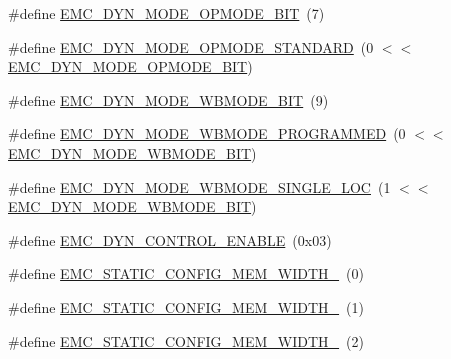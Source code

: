 \begin{DoxyCompactItemize}
\item 
\#define \hyperlink{group___e_m_c__18_x_x__43_x_x_ga8eb50a81b4d5000165734d85c5ecd2b3}{E\+M\+C\+\_\+\+D\+Y\+N\+\_\+\+M\+O\+D\+E\+\_\+\+O\+P\+M\+O\+D\+E\+\_\+\+B\+IT}~(7)
\item 
\#define \hyperlink{group___e_m_c__18_x_x__43_x_x_gad1a47dd7527a6cabcf3f4a692bcb4abe}{E\+M\+C\+\_\+\+D\+Y\+N\+\_\+\+M\+O\+D\+E\+\_\+\+O\+P\+M\+O\+D\+E\+\_\+\+S\+T\+A\+N\+D\+A\+RD}~(0 $<$$<$ \hyperlink{group___e_m_c__18_x_x__43_x_x_ga8eb50a81b4d5000165734d85c5ecd2b3}{E\+M\+C\+\_\+\+D\+Y\+N\+\_\+\+M\+O\+D\+E\+\_\+\+O\+P\+M\+O\+D\+E\+\_\+\+B\+IT})
\item 
\#define \hyperlink{group___e_m_c__18_x_x__43_x_x_gace9c2c7bc7470cb911f27bd4bb93e01c}{E\+M\+C\+\_\+\+D\+Y\+N\+\_\+\+M\+O\+D\+E\+\_\+\+W\+B\+M\+O\+D\+E\+\_\+\+B\+IT}~(9)
\item 
\#define \hyperlink{group___e_m_c__18_x_x__43_x_x_gad7781166a15c5968cfbbc19cf23e6e1e}{E\+M\+C\+\_\+\+D\+Y\+N\+\_\+\+M\+O\+D\+E\+\_\+\+W\+B\+M\+O\+D\+E\+\_\+\+P\+R\+O\+G\+R\+A\+M\+M\+ED}~(0 $<$$<$ \hyperlink{group___e_m_c__18_x_x__43_x_x_gace9c2c7bc7470cb911f27bd4bb93e01c}{E\+M\+C\+\_\+\+D\+Y\+N\+\_\+\+M\+O\+D\+E\+\_\+\+W\+B\+M\+O\+D\+E\+\_\+\+B\+IT})
\item 
\#define \hyperlink{group___e_m_c__18_x_x__43_x_x_gae4da736414dd77339c4d74811afddc32}{E\+M\+C\+\_\+\+D\+Y\+N\+\_\+\+M\+O\+D\+E\+\_\+\+W\+B\+M\+O\+D\+E\+\_\+\+S\+I\+N\+G\+L\+E\+\_\+\+L\+OC}~(1 $<$$<$ \hyperlink{group___e_m_c__18_x_x__43_x_x_gace9c2c7bc7470cb911f27bd4bb93e01c}{E\+M\+C\+\_\+\+D\+Y\+N\+\_\+\+M\+O\+D\+E\+\_\+\+W\+B\+M\+O\+D\+E\+\_\+\+B\+IT})
\item 
\#define \hyperlink{group___e_m_c__18_x_x__43_x_x_ga5e7e0c7690ffbd44c2a771aadb1af253}{E\+M\+C\+\_\+\+D\+Y\+N\+\_\+\+C\+O\+N\+T\+R\+O\+L\+\_\+\+E\+N\+A\+B\+LE}~(0x03)
\item 
\#define \hyperlink{group___e_m_c__18_x_x__43_x_x_ga782a1cc8e53705d8c3be24daf86ad83a}{E\+M\+C\+\_\+\+S\+T\+A\+T\+I\+C\+\_\+\+C\+O\+N\+F\+I\+G\+\_\+\+M\+E\+M\+\_\+\+W\+I\+D\+T\+H\+\_}~(0)
\item 
\#define \hyperlink{group___e_m_c__18_x_x__43_x_x_ga8307b8893057c7021c32c32ecf00809f}{E\+M\+C\+\_\+\+S\+T\+A\+T\+I\+C\+\_\+\+C\+O\+N\+F\+I\+G\+\_\+\+M\+E\+M\+\_\+\+W\+I\+D\+T\+H\+\_}~(1)
\item 
\#define \hyperlink{group___e_m_c__18_x_x__43_x_x_ga277e507176dc40984dfbc75a875f8ba3}{E\+M\+C\+\_\+\+S\+T\+A\+T\+I\+C\+\_\+\+C\+O\+N\+F\+I\+G\+\_\+\+M\+E\+M\+\_\+\+W\+I\+D\+T\+H\+\_}~(2)
\item 
$$
\end{DoxyCompactItemize}
